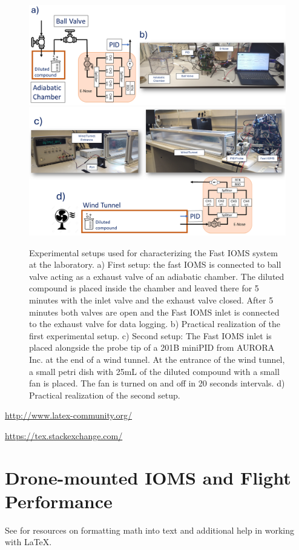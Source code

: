 \documentclass[lettersize,journal]{IEEEtran}
\begin{document}
\begin{figure}[t] %
	\centering
	\includegraphics[width=0.53\linewidth]{./images/fig2_ab.png}
	\hfill
	\includegraphics[width=0.45\linewidth]{./images/fig2_cd.png}
	\hfill
	\caption{Experimental setups used for characterizing the Fast IOMS system at the laboratory. a) First setup: the fast IOMS is connected to ball valve acting as a exhaust valve of an adiabatic chamber. The diluted compound is placed inside the chamber and leaved there for 5 minutes with the inlet valve and the exhaust valve closed. After 5 minutes both valves are open and the Fast IOMS inlet is connected to the exhaust valve for data logging. b) Practical realization of the first experimental setup. c) Second setup: The Fast IOMS inlet is placed alongside the probe tip of a 201B miniPID from AURORA Inc. at the end of a wind tunnel. At the entrance of the wind tunnel, a small petri dish with 25mL of the diluted compound with a small fan is placed. The fan is turned on and off in 20 seconds intervals. d) Practical realization of the second setup.}
	\label{fig:characSetups}
\end{figure}

\begin{list}{}{}
\item{\url{http://www.latex-community.org/}} 
\item{\url{https://tex.stackexchange.com/} }
\end{list}

\section{Drone-mounted IOMS and Flight Performance}
\label{sec:flyPerf}
See \cite{ref1,ref2,ref3,ref4,ref5} for resources on formatting math into text and additional help in working with \LaTeX .
\end{document}
